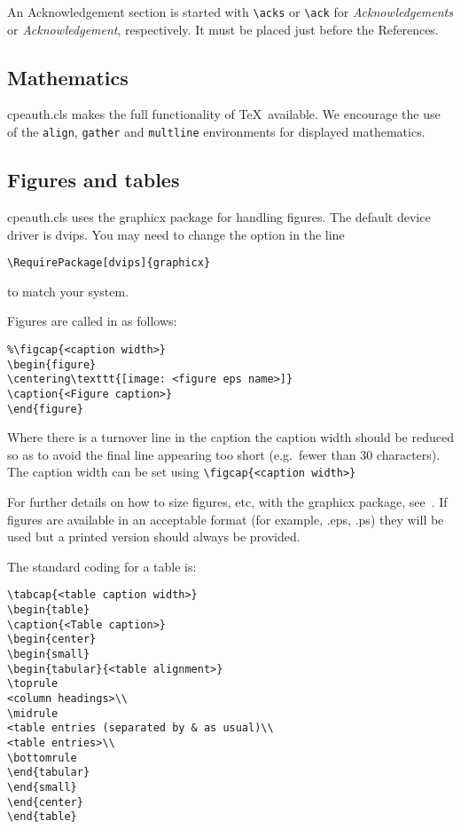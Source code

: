 \documentclass{cpeauth}
\begin{document}
An Acknowledgement section is started with \verb"\acks" or \verb"\ack"
for \textit{Acknowledgements} or \textit{Acknowledgement}, respectively.
It must be placed just before the References.

\subsection{Mathematics}
\textsf{cpeauth.cls} makes the full functionality of \AmS\/\TeX\ available.
We encourage the use of the \verb"align", \verb"gather" and \verb"multline"
environments for displayed mathematics.

\subsection{Figures and tables}
\textsf{cpeauth.cls} uses the \textsf{graphicx} package for handling figures.
The default device driver is \textsf{dvips}.
You may need to change the option in the line
\begin{verbatim}
\RequirePackage[dvips]{graphicx}
\end{verbatim}
to match your system.

Figures are called in as follows:
\begin{verbatim}
%\figcap{<caption width>}
\begin{figure}
\centering\texttt{[image: <figure eps name>]}
\caption{<Figure caption>}
\end{figure}
\end{verbatim}

Where there is a turnover line in the caption the caption width should be reduced so as
to avoid the final line appearing too short (e.g.\ fewer than 30 characters).
The caption width can be set using \verb"\figcap{<caption width>}"

For further details on how to size figures, etc,
with the \textsf{graphicx} package, see~\cite{Companion,KopkaDaly}.
If figures are available in an acceptable format (for example, .eps, .ps)
they will be used but a printed version should always be provided.
\mb

The standard coding for a table is:
\begin{verbatim}
\tabcap{<table caption width>}
\begin{table}
\caption{<Table caption>}
\begin{center}
\begin{small}
\begin{tabular}{<table alignment>}
\toprule
<column headings>\\
\midrule
<table entries (separated by & as usual)\\
<table entries>\\
\bottomrule
\end{tabular}
\end{small}
\end{center}
\end{table}
\end{verbatim}
\end{document}
